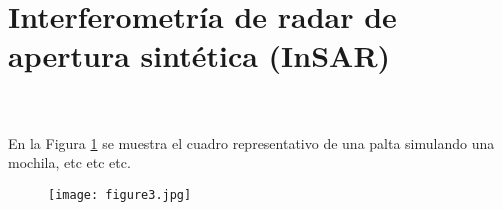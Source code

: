 \fontsize{14}{15}\selectfont
\section{Interferometría de radar de apertura sintética (InSAR)}
\blindtext\\

\blindtext\\

En la Figura \ref{ilustracion2} se muestra el cuadro representativo de una palta simulando una mochila, etc etc etc.\\

\begin{figure}[h]
	\centering
	\texttt{[image: figure3.jpg]} %
	\captionsetup{labelsep=period, labelfont=bf}
	\caption[Ilustración zorro en desierto]{\blindtext[1]} %
	\label{ilustracion2}
\end{figure}
